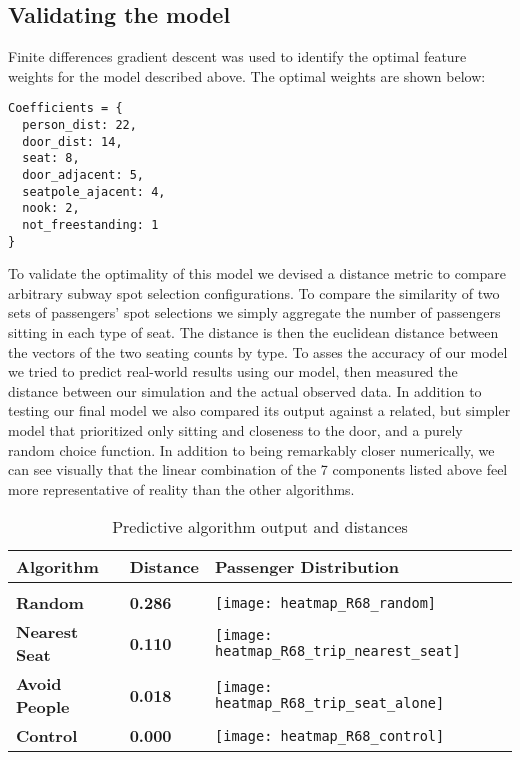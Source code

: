 \documentclass{acm_proc_article-sp}
\begin{document}
\subsection{Validating the model}
  Finite differences gradient descent\cite{flaxman2005online} was used to identify the optimal feature weights for the model described above. The optimal weights are shown below:
  \begin{lstlisting}
Coefficients = {
  person_dist: 22,
  door_dist: 14,
  seat: 8,
  door_adjacent: 5,
  seatpole_ajacent: 4,
  nook: 2,
  not_freestanding: 1
}
\end{lstlisting}

To validate the optimality of this model we devised a distance metric to compare arbitrary subway spot selection configurations. To compare the similarity of two sets of passengers' spot selections we simply aggregate the number of passengers sitting in each type of seat. The distance is then the euclidean distance between the vectors of the two seating counts by type. To asses the accuracy of our model we tried to predict real-world results using our model, then measured the distance between our simulation and the actual observed data. In addition to testing our final model we also compared its output against a related, but simpler model that prioritized only sitting and closeness to the door, and a purely random choice function. In addition to being remarkably closer numerically, we can see visually that the linear combination of the 7 components listed above feel more representative of reality than the other algorithms.

\begin{table*}[t]
  \caption{Predictive algorithm output and distances} \label{tab:compare_algosi}
  \begin{tabular}
      {lll} \hline Algorithm & Distance & Passenger Distribution \\ \hline \\
      \textbf{Random} & \textbf{0.286} & \parbox[c]{1em}{ \texttt{[image: heatmap\_R68\_random]}} \\
      \textbf{Nearest Seat} & \textbf{0.110} & \parbox[c]{1em}{ \texttt{[image: heatmap\_R68\_trip\_nearest\_seat]}} \\
      \textbf{Avoid People} & \textbf{0.018} & \parbox[c]{1em}{ \texttt{[image: heatmap\_R68\_trip\_seat\_alone]}} \\
      \textbf{Control} & \textbf{0.000} & \parbox[c]{1em}{ \texttt{[image: heatmap\_R68\_control]}} \\
 \end{tabular}
\end{table*}




\end{document}
